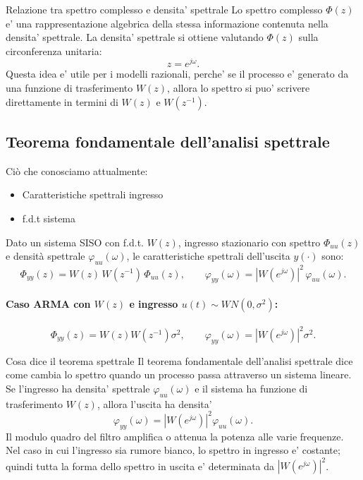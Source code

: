 \documentclass[11pt,a4paper]{article}
\begin{document}
\begin{spiegazione}{Relazione tra spettro complesso e densita' spettrale}
Lo spettro complesso $\Phi(z)$ e' una rappresentazione algebrica della stessa informazione contenuta nella densita' spettrale. La densita' spettrale si ottiene valutando $\Phi(z)$ sulla circonferenza unitaria:
\[
z=e^{j\omega}.
\]
Questa idea e' utile per i modelli razionali, perche' se il processo e' generato da una funzione di trasferimento $W(z)$, allora lo spettro si puo' scrivere direttamente in termini di $W(z)$ e $W(z^{-1})$.
\end{spiegazione}

\subsection{Teorema fondamentale dell'analisi spettrale}
Ciò che conosciamo attualmente:
\begin{itemize}
    \item Caratteristiche spettrali ingresso
    \item f.d.t sistema
\end{itemize}
Dato un sistema SISO con f.d.t. $W(z)$, ingresso stazionario con spettro $\Phi_{uu}(z)$ e densità spettrale $\varphi_{uu}(\omega)$, le caratteristiche spettrali dell'uscita $y(\cdot)$ sono:
\[
\Phi_{yy}(z)=W(z)\,W(z^{-1})\,\Phi_{uu}(z),\qquad \varphi_{yy}(\omega)=|W(e^{j\omega})|^2\,\varphi_{uu}(\omega).
\]

\paragraph{Caso ARMA con $W(z)$ e ingresso $u(t)\sim WN(0,\sigma^2)$:}

\[
\Phi_{yy}(z)=W(z)W(z^{-1})\sigma^2,\qquad \varphi_{yy}(\omega)=|W(e^{j\omega})|^2\sigma^2.
\]

\begin{spiegazione}{Cosa dice il teorema spettrale}
Il teorema fondamentale dell'analisi spettrale dice come cambia lo spettro quando un processo passa attraverso un sistema lineare. Se l'ingresso ha densita' spettrale $\varphi_{uu}(\omega)$ e il sistema ha funzione di trasferimento $W(z)$, allora l'uscita ha densita'
\[
\varphi_{yy}(\omega)=|W(e^{j\omega})|^2\varphi_{uu}(\omega).
\]
Il modulo quadro del filtro amplifica o attenua la potenza alle varie frequenze. Nel caso in cui l'ingresso sia rumore bianco, lo spettro in ingresso e' costante; quindi tutta la forma dello spettro in uscita e' determinata da $|W(e^{j\omega})|^2$.
\end{spiegazione}
\end{document}
